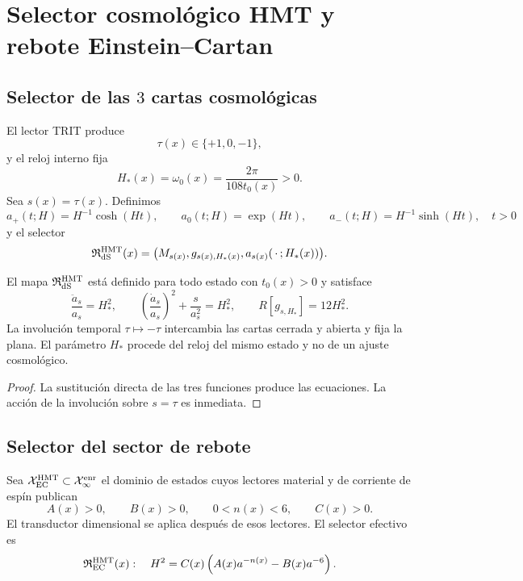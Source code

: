 \section{Selector cosmológico HMT y rebote Einstein--Cartan}
\label{sec:hmtf2-selector-cosmologico}

\subsection{Selector de las \(3\) cartas cosmológicas}

El lector TRIT produce
\[
 \tau(x)\in\{+1,0,-1\},
\]
y el reloj interno fija
\[
 H_*(x)=\omega_0(x)=\frac{2\pi}{108t_0(x)}>0.
\]
Sea \(s(x)=\tau(x)\). Definimos
\[
 a_{+}(t;H)=H^{-1}\cosh(Ht),\qquad
 a_0(t;H)=\exp(Ht),\qquad
 a_{-}(t;H)=H^{-1}\sinh(Ht),\quad t>0
\]
y el selector
\[
 \mathfrak R_{\rm dS}^{\rm HMT}(x)
 =\bigl(M_{s(x)},g_{s(x),H_*(x)},a_{s(x)}(\,\cdot\,;H_*(x))\bigr).
\]

\begin{theorem}
\label{thm:hmtf2-selector-ds}
El mapa \(\mathfrak R_{\rm dS}^{\rm HMT}\) está definido para todo estado
con \(t_0(x)>0\) y satisface
\[
 \frac{\ddot a_s}{a_s}=H_*^2,\qquad
 \left(\frac{\dot a_s}{a_s}\right)^2+\frac{s}{a_s^2}=H_*^2,
 \qquad
 R[g_{s,H_*}]=12H_*^2.
\]
La involución temporal \(\tau\mapsto-\tau\) intercambia las cartas cerrada y
abierta y fija la plana. El parámetro \(H_*\) procede del reloj del mismo
estado y no de un ajuste cosmológico.
\end{theorem}

\begin{proof}
La sustitución directa de las tres funciones produce las ecuaciones. La
acción de la involución sobre \(s=\tau\) es inmediata.
\end{proof}

\subsection{Selector del sector de rebote}

Sea \(\mathcal X_{\rm EC}^{\rm HMT}\subset\mathcal X_\infty^{\rm enr}\) el
dominio de estados cuyos lectores material y de corriente de espín publican
\[
 A(x)>0,\qquad B(x)>0,\qquad 0<n(x)<6,\qquad C(x)>0.
\]
El transductor dimensional se aplica después de esos lectores. El selector
efectivo es
\[
 \mathfrak R_{\rm EC}^{\rm HMT}(x):
 \quad
 H^2=C(x)\left(A(x)a^{-n(x)}-B(x)a^{-6}\right).
\]

